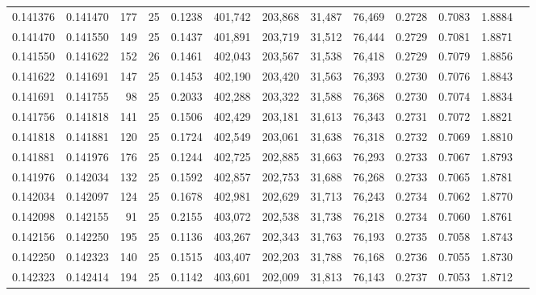 \begin{tabular}{rrrrrrrrrrrrr}
0.141376 & 0.141470 &   177 &  25 &                                     0.1238 & 401,742 & 203,868 &  31,487 &  76,469 & 0.2728 & 0.7083 & 1.8884 \\
0.141470 & 0.141550 &   149 &  25 &                                     0.1437 & 401,891 & 203,719 &  31,512 &  76,444 & 0.2729 & 0.7081 & 1.8871 \\
0.141550 & 0.141622 &   152 &  26 &                                     0.1461 & 402,043 & 203,567 &  31,538 &  76,418 & 0.2729 & 0.7079 & 1.8856 \\
0.141622 & 0.141691 &   147 &  25 &                                     0.1453 & 402,190 & 203,420 &  31,563 &  76,393 & 0.2730 & 0.7076 & 1.8843 \\
0.141691 & 0.141755 &    98 &  25 &                                     0.2033 & 402,288 & 203,322 &  31,588 &  76,368 & 0.2730 & 0.7074 & 1.8834 \\
0.141756 & 0.141818 &   141 &  25 &                                     0.1506 & 402,429 & 203,181 &  31,613 &  76,343 & 0.2731 & 0.7072 & 1.8821 \\
0.141818 & 0.141881 &   120 &  25 &                                     0.1724 & 402,549 & 203,061 &  31,638 &  76,318 & 0.2732 & 0.7069 & 1.8810 \\
0.141881 & 0.141976 &   176 &  25 &                                     0.1244 & 402,725 & 202,885 &  31,663 &  76,293 & 0.2733 & 0.7067 & 1.8793 \\
0.141976 & 0.142034 &   132 &  25 &                                     0.1592 & 402,857 & 202,753 &  31,688 &  76,268 & 0.2733 & 0.7065 & 1.8781 \\
0.142034 & 0.142097 &   124 &  25 &                                     0.1678 & 402,981 & 202,629 &  31,713 &  76,243 & 0.2734 & 0.7062 & 1.8770 \\
0.142098 & 0.142155 &    91 &  25 &                                     0.2155 & 403,072 & 202,538 &  31,738 &  76,218 & 0.2734 & 0.7060 & 1.8761 \\
0.142156 & 0.142250 &   195 &  25 &                                     0.1136 & 403,267 & 202,343 &  31,763 &  76,193 & 0.2735 & 0.7058 & 1.8743 \\
0.142250 & 0.142323 &   140 &  25 &                                     0.1515 & 403,407 & 202,203 &  31,788 &  76,168 & 0.2736 & 0.7055 & 1.8730 \\
0.142323 & 0.142414 &   194 &  25 &                                     0.1142 & 403,601 & 202,009 &  31,813 &  76,143 & 0.2737 & 0.7053 & 1.8712 \\

\end{tabular}
